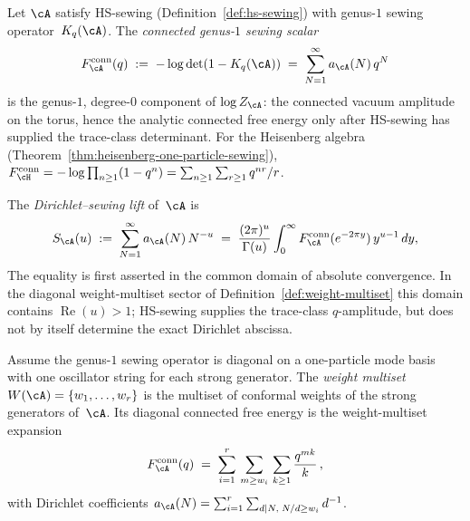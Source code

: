\begin{definition}%
\label{def:connected-genus1-free-energy}%
%
\ClaimStatusDefinitional
Let $\cA$ satisfy HS-sewing
(Definition~\ref{def:hs-sewing}) with genus-$1$ sewing
operator~$K_q(\cA)$.
The \emph{connected genus-$1$ sewing scalar}
\begin{equation}\label{eq:connected-free-energy}
F_\cA^{\mathrm{conn}}(q)
\;:=\;
-\log\det(1 - K_q(\cA))
\;=\;
\sum_{N=1}^\infty a_\cA(N)\, q^N
\end{equation}
is the genus-$1$, degree-$0$ component of
$\log Z_\cA$: the connected vacuum amplitude on the torus, hence the
analytic connected free energy only after HS-sewing has supplied the
trace-class determinant.
For the Heisenberg algebra
(Theorem~\ref{thm:heisenberg-one-particle-sewing}),
$F_\cH^{\mathrm{conn}} = -\log\prod_{n \geq 1}(1-q^n) =
\sum_{n \geq 1}\sum_{r \geq 1} q^{nr}/r$.
\end{definition}

\begin{definition}%
\label{def:dirichlet-sewing-lift}%
%
%
The \emph{Dirichlet--sewing lift} of~$\cA$ is
\begin{equation}\label{eq:dirichlet-sewing-lift}
S_\cA(u)
\;:=\;
\sum_{N=1}^\infty a_\cA(N)\, N^{-u}
\;=\;
\frac{(2\pi)^u}{\Gamma(u)}
\int_0^\infty
F_\cA^{\mathrm{conn}}(e^{-2\pi y})\,y^{u-1}\,dy,
\end{equation}
The equality is first asserted in the common domain of absolute
convergence. In the diagonal weight-multiset sector of
Definition~\ref{def:weight-multiset} this domain contains
$\operatorname{Re}(u)>1$; HS-sewing supplies the trace-class
$q$-amplitude, but does not by itself determine the exact Dirichlet
abscissa.
\end{definition}

\begin{definition}%
\label{def:weight-multiset}%
%
Assume the genus-$1$ sewing operator is diagonal on a one-particle
mode basis with one oscillator string for each strong generator. The
\emph{weight multiset}
$W(\cA) = \{w_1, \ldots, w_r\}$
is the multiset of conformal weights of the strong generators
of~$\cA$. Its diagonal connected free energy is the
weight-multiset expansion
\begin{equation}\label{eq:weight-multiset-expansion}
F_\cA^{\mathrm{conn}}(q)
\;=\;
\sum_{i=1}^r\,
\sum_{m \geq w_i}\,
\sum_{k \geq 1}
\frac{q^{mk}}{k}\,,
\end{equation}
with Dirichlet coefficients
$a_\cA(N) = \sum_{i=1}^r
\sum_{\substack{d \mid N,\; N/d \geq w_i}}d^{-1}$.
\end{definition}

